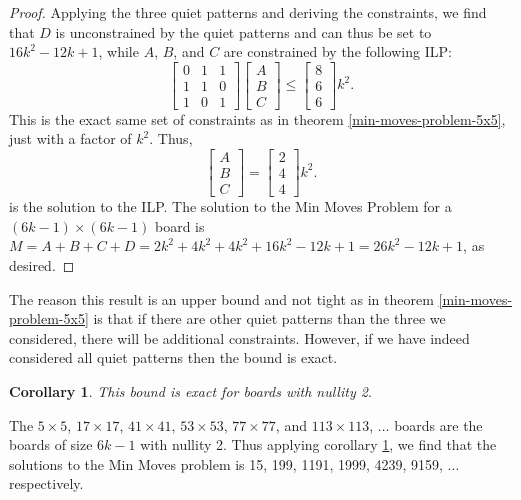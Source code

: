 \documentclass[a4paper]{article}
\newtheorem{corollary}{Corollary}
\begin{document}
\begin{proof}
		Applying the three quiet patterns and deriving the constraints, we find that $D$ is unconstrained by the quiet patterns and can thus be set to $16k^2 - 12k + 1$, while $A$, $B$, and $C$ are constrained by the following ILP:
		\begin{equation}
			\begin{bmatrix}
				0 & 1 & 1 \\
				1 & 1 & 0 \\
				1 & 0 & 1 
			\end{bmatrix}
			\begin{bmatrix}
				A \\
				B \\
				C
			\end{bmatrix}
			\leq
			\begin{bmatrix}
				8 \\
				6 \\
				6
			\end{bmatrix}k^2.
		\end{equation}
		This is the exact same set of constraints as in theorem \ref{min-moves-problem-5x5}, just with a factor of $k^2$.
		Thus,
		\begin{equation*}
			\begin{bmatrix}
				A \\
				B \\
				C
			\end{bmatrix}
			=
			\begin{bmatrix}
				2 \\
				4 \\
				4
			\end{bmatrix}k^2.
		\end{equation*}
		is the solution to the ILP.
		The solution to the Min Moves Problem for a $(6k-1) \times (6k-1)$ board is $M = A + B + C + D = 2k^2 + 4k^2 +  4k^2 + 16k^2 - 12k + 1 = 26k^2 - 12k + 1$, as desired.
	\end{proof}

	The reason this result is an upper bound and not tight as in theorem \ref{min-moves-problem-5x5} is that if there are other quiet patterns than the three we considered, there will be additional constraints.
	However, if we have indeed considered all quiet patterns then the bound is exact.

	\begin{corollary}\label{min-moves-6k-1-cor}
		This bound is exact for boards with nullity 2.
	\end{corollary}

	The $5 \times 5$, $17 \times 17$, $41 \times 41$, $53 \times 53$, $77 \times 77$, and $113 \times 113$, $\dots$ boards are the boards of size $6k-1$ with nullity 2.
	Thus applying corollary \ref{min-moves-6k-1-cor}, we find that the solutions to the Min Moves problem is 15, 199, 1191, 1999, 4239, 9159, $\dots$ respectively.
	
\end{document}
